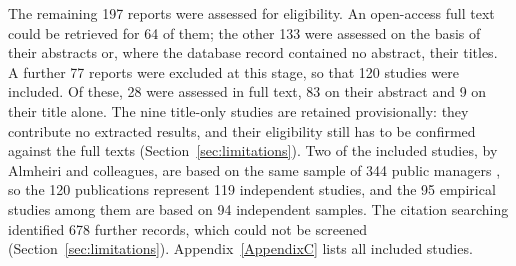 The remaining 197 reports were assessed for eligibility. An open-access full text could be retrieved for 64 of them; the other 133 were assessed on the basis of their abstracts or, where the database record contained no abstract, their titles. A further 77 reports were excluded at this stage, so that 120 studies were included. Of these, 28 were assessed in full text, 83 on their abstract and 9 on their title alone. The nine title-only studies are retained provisionally: they contribute no extracted results, and their eligibility still has to be confirmed against the full texts (Section~\ref{sec:limitations}). Two of the included studies, by Almheiri and colleagues, are based on the same sample of 344 public managers \parencite{almheiri2024, almheiri2025}, so the 120 publications represent 119 independent studies, and the 95 empirical studies among them are based on 94 independent samples. The citation searching identified 678 further records, which could not be screened (Section~\ref{sec:limitations}). Appendix~\ref{AppendixC} lists all included studies.

